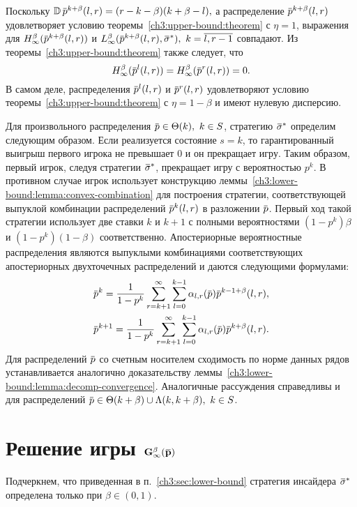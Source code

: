 {Поскольку
$
  \D \p^{k+\beta}(l, r) = (r-k-\beta)(k+\beta-l),
$
а распределение $\p^{k+\beta}(l, r)$ удовлетворяет условию теоремы~\ref{ch3:upper-bound:theorem} с $\eta = 1$, выражения для $\High[\infty](\p^{k+\beta}(l, r))$ и $\Low[\infty](\p^{k+\beta}(l, r), \sigmav^*),\ k = \overline{l,r-1}$ совпадают.
Из теоремы~\ref{ch3:upper-bound:theorem} также следует, что
\begin{equation*}
  \High[\infty](\p^l(l,r)) = \High[\infty](\p^r(l,r)) = 0.
\end{equation*}
В самом деле, распределения $\p^l(l,r)$ и $\p^r(l,r)$ удовлетворяют условию теоремы~\ref{ch3:upper-bound:theorem} с $\eta = 1-\beta$ и имеют нулевую дисперсию.

Для произвольного распределения $\p \in \Theta(k),\ k \in S$, стратегию $\sigmav^*$ определим следующим образом.
Если реализуется состояние $s = k$, то гарантированный выигрыш первого игрока не превышает $0$ и он прекращает игру.
Таким образом, первый игрок, следуя стратегии $\sigmav^*$, прекращает игру с вероятностью $p^k$.
В противном случае игрок использует конструкцию леммы~\ref{ch3:lower-bound:lemma:convex-combination} для построения стратегии, соответствующей выпуклой комбинации распределений $\p^k(l, r)$ в разложении $\p$.
Первый ход такой стратегии использует две ставки $k$ и $k+1$ с полными вероятностями $(1-p^k)\beta$ и $(1-p^k)(1-\beta)$ соответственно.
Апостериорные вероятностные распределения являются выпуклыми комбинациями соответствующих апостериорных двухточечных распределений и даются следующими формулами:
\begin{gather*}
  \p^k = \frac{1}{1-p^k} \sum_{r=k+1}^\infty \sum_{l=0}^{k-1} \alpha_{l,r}(\p) \p^{k-1+\beta}(l, r), \\
  \p^{k+1} = \frac{1}{1-p^k} \sum_{r=k+1}^\infty \sum_{l=0}^{k-1} \alpha_{l,r}(\p) \p^{k+\beta}(l, r).
\end{gather*}
Для распределений $\p$ со счетным носителем сходимость по норме данных рядов устанавливается аналогично доказательству леммы~\ref{ch3:lower-bound:lemma:decomp-convergence}.
Аналогичные рассуждения справедливы и для распределений $\p \in \Theta(k+\beta) \cup \Lambda(k, k+\beta),\ k \in S$.

\section{Решение игры $\mathbf{G^\beta_\infty(\p)}$}
\label{ch3:sec:game-solution}

Подчеркнем, что приведенная в п.~\ref{ch3:sec:lower-bound} стратегия инсайдера $\sigmav^*$ определена только при $\beta \in (0, 1)$.

}

